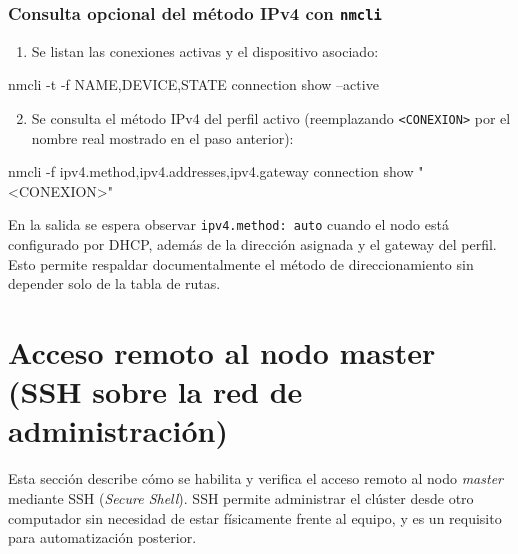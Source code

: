 \subsubsection*{Consulta opcional del método IPv4 con \texttt{nmcli}}
\begin{enumerate}
  \item Se listan las conexiones activas y el dispositivo asociado:
\end{enumerate}

\begin{terminalblock}
nmcli -t -f NAME,DEVICE,STATE connection show --active
\end{terminalblock}


\begin{enumerate}
  \setcounter{enumi}{1}
  \item Se consulta el método IPv4 del perfil activo (reemplazando \texttt{<CONEXION>} por el nombre real mostrado en el paso anterior):
\end{enumerate}

\begin{terminalblock}
nmcli -f ipv4.method,ipv4.addresses,ipv4.gateway connection show "<CONEXION>"
\end{terminalblock}

En la salida se espera observar \texttt{ipv4.method: auto} cuando el nodo está configurado por DHCP, además de la dirección asignada y el gateway del perfil. Esto permite respaldar documentalmente el método de direccionamiento sin depender solo de la tabla de rutas. \cite{nm_settings_nmcli}

\section{Acceso remoto al nodo master (SSH sobre la red de administración)}
\label{sec:ssh_master}

Esta sección describe cómo se habilita y verifica el acceso remoto al nodo \textit{master} mediante SSH (\textit{Secure Shell}). SSH permite administrar el clúster desde otro computador sin necesidad de estar físicamente frente al equipo, y es un requisito para automatización posterior.

